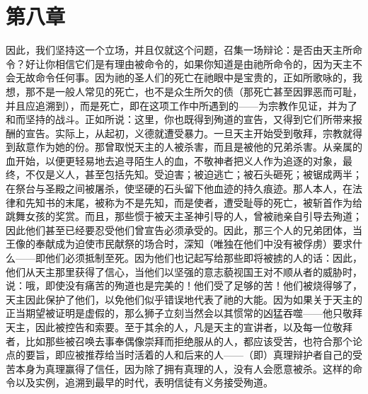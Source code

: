 
\section{第八章}

因此，我们坚持这一个立场，并且仅就这个问题，召集一场辩论：是否由天主所命令？好让你相信它们是有理由被命令的，如果你知道是由祂所命令的，因为天主不会无故命令任何事。因为祂的圣人们的死亡在祂眼中是宝贵的，正如所歌咏的，我想，那不是一般人常见的死亡，也不是众生所欠的债（那死亡甚至因罪恶而可耻，并且应追溯到），而是死亡，即在这项工作中所遇到的——为宗教作见证，并为了和而坚持的战斗。正如所说：这里，你也既得到殉道的宣告，又得到它们所带来报酬的宣告。实际上，从起初，义德就遭受暴力。一旦天主开始受到敬拜，宗教就得到敌意作为她的份。那曾取悦天主的人被杀害，而且是被他的兄弟杀害。从亲属的血开始，以便更轻易地去追寻陌生人的血，不敬神者把义人作为追逐的对象，最终，不仅是义人，甚至包括先知。受迫害；被迫逃亡；被石头砸死；被锯成两半；在祭台与圣殿之间被屠杀，使坚硬的石头留下他血迹的持久痕迹。那人本人，在法律和先知书的末尾，被称为不是先知，而是使者，遭受耻辱的死亡，被斩首作为给跳舞女孩的奖赏。而且，那些惯于被天主圣神引导的人，曾被祂亲自引导去殉道；因此他们甚至已经要忍受他们曾宣告必须承受的。因此，那三个人的兄弟团体，当王像的奉献成为迫使市民献祭的场合时，深知（唯独在他们中没有被俘虏）要求什么——即他们必须抵制至死。因为他们也记起写给那些即将被掳的人的话：因此，他们从天主那里获得了信心，当他们以坚强的意志藐视国王对不顺从者的威胁时，说：哦，即使没有痛苦的殉道也是完美的！他们受了足够的苦！他们被烧得够了，天主因此保护了他们，以免他们似乎错误地代表了祂的大能。因为如果关于天主的正当期望被证明是虚假的，那么狮子立刻当然会以其惯常的凶猛吞噬——他只敬拜天主，因此被控告和索要。至于其余的人，凡是天主的宣讲者，以及每一位敬拜者，比如那些被召唤去事奉偶像崇拜而拒绝服从的人，都应该受苦，也符合那个论点的要旨，即应被推荐给当时活着的人和后来的人——（即）真理辩护者自己的受苦本身为真理赢得了信任，因为除了拥有真理的人，没有人会愿意被杀。这样的命令以及实例，追溯到最早的时代，表明信徒有义务接受殉道。\par

